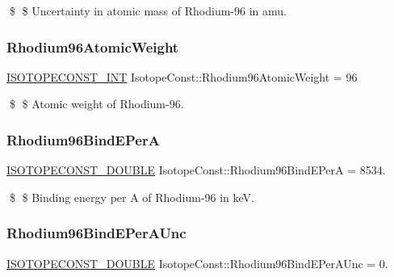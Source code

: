 \$ \$ Uncertainty in atomic mass of Rhodium-\/96 in amu. \mbox{\label{group___isotope_const-_rhodium-_rh96_ga79f67b2d005eb11d291729fcfa33110a}} 
\subsubsection{\texorpdfstring{Rhodium96\+Atomic\+Weight}{Rhodium96AtomicWeight}}
{\footnotesize\ttfamily \mbox{\hyperlink{group___isotope_const-_macros_ga5f18360b3e99483a35c32d789e62621c}{I\+S\+O\+T\+O\+P\+E\+C\+O\+N\+S\+T\+\_\+\+I\+NT}} Isotope\+Const\+::\+Rhodium96\+Atomic\+Weight = 96}

\$ \$ Atomic weight of Rhodium-\/96. \mbox{\label{group___isotope_const-_rhodium-_rh96_ga3f373e90e1f8229adb860766536e67d0}} 
\subsubsection{\texorpdfstring{Rhodium96\+Bind\+E\+PerA}{Rhodium96BindEPerA}}
{\footnotesize\ttfamily \mbox{\hyperlink{group___isotope_const-_macros_ga8f45a7272ce02c0b4c65c44636ed719a}{I\+S\+O\+T\+O\+P\+E\+C\+O\+N\+S\+T\+\_\+\+D\+O\+U\+B\+LE}} Isotope\+Const\+::\+Rhodium96\+Bind\+E\+PerA = 8534.}

\$ \$ Binding energy per A of Rhodium-\/96 in keV. \mbox{\label{group___isotope_const-_rhodium-_rh96_ga2de5d566a53454e394bd138fd8343844}} 
\subsubsection{\texorpdfstring{Rhodium96\+Bind\+E\+Per\+A\+Unc}{Rhodium96BindEPerAUnc}}
{\footnotesize\ttfamily \mbox{\hyperlink{group___isotope_const-_macros_ga8f45a7272ce02c0b4c65c44636ed719a}{I\+S\+O\+T\+O\+P\+E\+C\+O\+N\+S\+T\+\_\+\+D\+O\+U\+B\+LE}} Isotope\+Const\+::\+Rhodium96\+Bind\+E\+Per\+A\+Unc = 0.}

